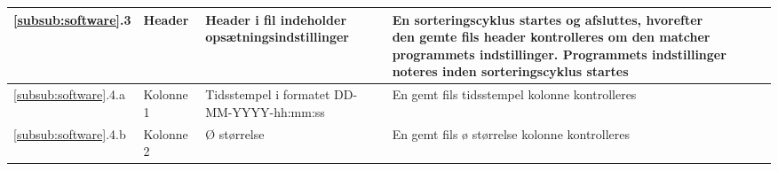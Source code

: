 \begin{center}
\begin{longtable}{ | m{1.785cm} | m{1.785cm}| m{1.785cm}| m{1.785cm}| m{1.785cm}| m{1.785cm}|m{1.785cm}| }
						\ref{subsub:software}.3
			& 
Header \
   & 
Header i fil indeholder opsætningsindstillinger
    &
     En sorteringscyklus startes og afsluttes, hvorefter den gemte fils header kontrolleres om den matcher programmets indstillinger. Programmets indstillinger noteres inden sorteringscyklus startes
    &  & & \\
			\hline	
			
			\hline	
			
						\ref{subsub:software}.4.a
			& 
Kolonne 1 \
   & 
Tidsstempel i formatet DD-MM-YYYY-hh:mm:ss 
    &
     En gemt fils tidsstempel kolonne kontrolleres
    &  & & \\
			\hline	
			
			\hline	
			
						\ref{subsub:software}.4.b
			& 
Kolonne 2 \
   & 
Ø størrelse
    &
     En gemt fils ø størrelse kolonne kontrolleres
    &  & & \\
			\hline	
				
			
			
			
			
\end{longtable}
		
	\end{center}
	\pagebreak